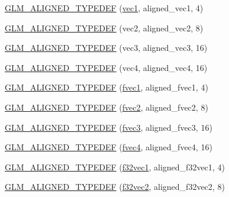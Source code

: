 \begin{DoxyCompactItemize}
\item 
\hyperlink{group__gtx__type__aligned_ga81bc497b2bfc6f80bab690c6ee28f0f9}{G\+L\+M\+\_\+\+A\+L\+I\+G\+N\+E\+D\+\_\+\+T\+Y\+P\+E\+D\+E\+F} (\hyperlink{namespaceglm_a16030dae9029ed1eab1553a2183bbb79}{vec1}, aligned\+\_\+vec1, 4)
\item 
\hyperlink{group__gtx__type__aligned_gada3e8f783e9d4b90006695a16c39d4d4}{G\+L\+M\+\_\+\+A\+L\+I\+G\+N\+E\+D\+\_\+\+T\+Y\+P\+E\+D\+E\+F} (vec2, aligned\+\_\+vec2, 8)
\item 
\hyperlink{group__gtx__type__aligned_gab8d081fac3a38d6f55fa552f32168d32}{G\+L\+M\+\_\+\+A\+L\+I\+G\+N\+E\+D\+\_\+\+T\+Y\+P\+E\+D\+E\+F} (vec3, aligned\+\_\+vec3, 16)
\item 
\hyperlink{group__gtx__type__aligned_ga12fe7b9769c964c5b48dcfd8b7f40198}{G\+L\+M\+\_\+\+A\+L\+I\+G\+N\+E\+D\+\_\+\+T\+Y\+P\+E\+D\+E\+F} (vec4, aligned\+\_\+vec4, 16)
\item 
\hyperlink{group__gtx__type__aligned_gaefab04611c7f8fe1fd9be3071efea6cc}{G\+L\+M\+\_\+\+A\+L\+I\+G\+N\+E\+D\+\_\+\+T\+Y\+P\+E\+D\+E\+F} (\hyperlink{group__gtc__type__precision_gaa732e5d06540922c44d3e35f32d6e948}{fvec1}, aligned\+\_\+fvec1, 4)
\item 
\hyperlink{group__gtx__type__aligned_ga2543c05ba19b3bd19d45b1227390c5b4}{G\+L\+M\+\_\+\+A\+L\+I\+G\+N\+E\+D\+\_\+\+T\+Y\+P\+E\+D\+E\+F} (\hyperlink{group__gtc__type__precision_ga83fb34639f810d0c9240cf7ff0180e20}{fvec2}, aligned\+\_\+fvec2, 8)
\item 
\hyperlink{group__gtx__type__aligned_ga009afd727fd657ef33a18754d6d28f60}{G\+L\+M\+\_\+\+A\+L\+I\+G\+N\+E\+D\+\_\+\+T\+Y\+P\+E\+D\+E\+F} (\hyperlink{group__gtc__type__precision_ga8480fdaa7fb8e177e57b367be79863d8}{fvec3}, aligned\+\_\+fvec3, 16)
\item 
\hyperlink{group__gtx__type__aligned_ga2f26177e74bfb301a3d0e02ec3c3ef53}{G\+L\+M\+\_\+\+A\+L\+I\+G\+N\+E\+D\+\_\+\+T\+Y\+P\+E\+D\+E\+F} (\hyperlink{group__gtc__type__precision_ga396c4084cd7e5465f8b56035e0420c3e}{fvec4}, aligned\+\_\+fvec4, 16)
\item 
\hyperlink{group__gtx__type__aligned_ga309f495a1d6b75ddf195b674b65cb1e4}{G\+L\+M\+\_\+\+A\+L\+I\+G\+N\+E\+D\+\_\+\+T\+Y\+P\+E\+D\+E\+F} (\hyperlink{group__gtc__type__precision_ga6fb588b465f2252b473582159c31c40c}{f32vec1}, aligned\+\_\+f32vec1, 4)
\item 
\hyperlink{group__gtx__type__aligned_ga5e185865a2217d0cd47187644683a8c3}{G\+L\+M\+\_\+\+A\+L\+I\+G\+N\+E\+D\+\_\+\+T\+Y\+P\+E\+D\+E\+F} (\hyperlink{group__gtc__type__precision_ga8681dee3524dea86388178c49c27079a}{f32vec2}, aligned\+\_\+f32vec2, 8)

\end{DoxyCompactItemize}
